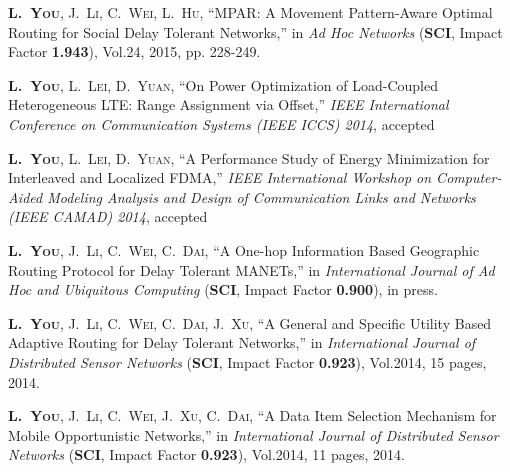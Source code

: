 
\begin{publications}{99}

%

\item\textsc{\textbf{L.~You}, J.~Li, C.~Wei, L.~Hu}, ``MPAR: A Movement Pattern-Aware Optimal Routing for Social Delay Tolerant Networks,'' in \textit{Ad Hoc Networks} (\textbf{SCI}, Impact Factor \textbf{1.943}), Vol.24, 2015, pp. 228-249.

\item\textsc{\textbf{L.~You}, L.~Lei, D.~Yuan}, ``On Power Optimization of Load-Coupled Heterogeneous LTE: Range Assignment via Offset,'' \textit{IEEE International Conference on Communication Systems (IEEE ICCS) 2014}, accepted

\item\textsc{\textbf{L.~You}, L.~Lei, D.~Yuan}, ``A Performance Study of Energy Minimization for Interleaved and Localized FDMA,'' \textit{IEEE International Workshop on Computer-Aided Modeling Analysis and Design of Communication Links and Networks (IEEE CAMAD) 2014}, accepted


\item\textsc{\textbf{L.~You}, J.~Li, C.~Wei, C.~Dai}, ``A One-hop Information Based Geographic Routing Protocol for Delay Tolerant MANETs,'' in \textit{International Journal of Ad Hoc and Ubiquitous Computing} (\textbf{SCI}, Impact Factor \textbf{0.900}), in press.

\item\textsc{\textbf{L.~You}, J.~Li, C.~Wei, C.~Dai, J.~Xu}, ``A General and Specific Utility Based Adaptive Routing for Delay Tolerant Networks,'' in \textit{International Journal of Distributed Sensor Networks} (\textbf{SCI}, Impact Factor \textbf{0.923}), Vol.2014, 15 pages, 2014.

\item\textsc{\textbf{L.~You}, J.~Li, C.~Wei, J.~Xu, C.~Dai}, ``A Data Item Selection Mechanism for Mobile Opportunistic Networks,'' in \textit{International Journal of Distributed Sensor Networks} (\textbf{SCI}, Impact Factor \textbf{0.923}), Vol.2014, 11 pages, 2014.


\end{publications}
